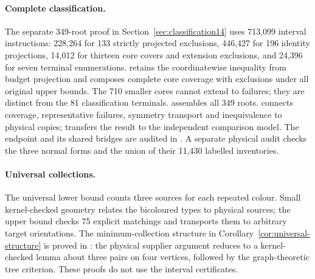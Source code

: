 \paragraph{Complete classification.}
The separate 349-root proof in Section~\ref{sec:classification14} uses
713,099 interval instructions: 228,264 for 133 strictly projected exclusions,
446,427 for 196 identity projections, 14,012 for thirteen core covers and
extension exclusions, and 24,396 for seven terminal enumerations.
 retains the coordinatewise inequality from budget
projection and composes complete core coverage with exclusions under all
original upper bounds. The 710 smaller cores cannot extend to failures;
they are distinct from the 81 classification terminals.
 assembles all 349 roots.
 connects coverage, representative failures,
symmetry transport and inequivalence to physical copies;
 transfers the result to the independent
comparison model. The endpoint and its shared bridges are audited in
. A separate physical audit checks the three
normal forms and the union of their 11,430 labelled inventories.

\paragraph{Universal collections.} The universal lower bound counts three sources for each repeated colour.
Small kernel-checked geometry relates the bicoloured types to physical sources;
the upper bound checks 75 explicit matchings and transports them to arbitrary
target orientations. The minimum-collection structure in Corollary~\ref{cor:universal-structure}
is proved in : the physical supplier argument
reduces to a kernel-checked lemma about three pairs on four vertices, followed
by the graph-theoretic tree criterion. These proofs do not use the interval
certificates.


